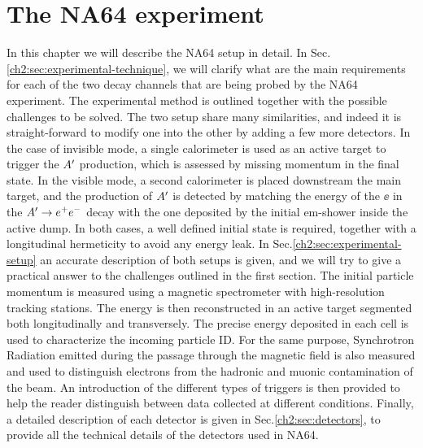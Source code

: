 
\newcommand{\pdirtwo}{chapters/plots/chapter2}

\chapter{The NA64 experiment} %

\label{chapter2} %


In this chapter we will describe the NA64 setup in detail. In Sec.\ref{ch2:sec:experimental-technique}, we will clarify what are the main requirements for each of the two decay channels that are being probed by the NA64 experiment. The experimental method is outlined together with the possible challenges to be solved. The two setup share many similarities, and indeed it is straight-forward to modify one into the other by adding a few more detectors. In the case of invisible mode, a single calorimeter is used as an active target to trigger the $A'$ production, which is assessed by missing momentum in the final state. In the visible mode, a second calorimeter is placed downstream the main target, and the production of $A'$ is detected by matching the energy of the $\ee$ in the $A' \to e^+e^-$ decay with the one deposited by the initial em-shower inside the active dump. In both cases, a well defined initial state is required, together with a longitudinal hermeticity to avoid any energy leak. In Sec.\ref{ch2:sec:experimental-setup} an accurate description of both setups is given, and we will try to give a practical answer to the challenges outlined in the first section. The initial particle momentum is measured using a magnetic spectrometer with high-resolution tracking stations. The energy is then reconstructed in an active target segmented both longitudinally and transversely. The precise energy deposited in each cell is used to characterize the incoming particle ID. For the same purpose, Synchrotron Radiation emitted during the passage through the magnetic field is also measured and used to distinguish electrons from the hadronic and muonic contamination of the beam. An introduction of the different types of triggers is then provided to help the reader distinguish between data collected at different conditions.
Finally, a detailed description of each detector is given in Sec.\ref{ch2:sec:detectors}, to provide all the technical details of the detectors used in NA64. 

